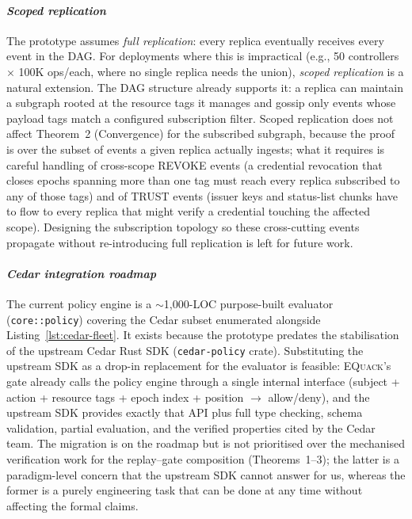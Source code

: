 \documentclass[10pt,journal,compsoc]{IEEEtran}
\newcommand{\equack}{\textsc{EQuack}}
\begin{document}
\paragraph*{\textit{Scoped replication}}
The prototype assumes \emph{full replication}: every replica eventually receives every event in the DAG. For deployments where this is impractical (e.g., 50 controllers $\times$ 100K ops/each, where no single replica needs the union), \emph{scoped replication} is a natural extension. The DAG structure already supports it: a replica can maintain a subgraph rooted at the resource tags it manages and gossip only events whose payload tags match a configured subscription filter. Scoped replication does not affect Theorem~2 (Convergence) for the subscribed subgraph, because the proof is over the subset of events a given replica actually ingests; what it requires is careful handling of cross-scope \textsc{REVOKE} events (a credential revocation that closes epochs spanning more than one tag must reach every replica subscribed to any of those tags) and of TRUST events (issuer keys and status-list chunks have to flow to every replica that might verify a credential touching the affected scope). Designing the subscription topology so these cross-cutting events propagate without re-introducing full replication is left for future work.

\paragraph*{\textit{Cedar integration roadmap}}
The current policy engine is a $\sim$1{,}000-LOC purpose-built evaluator (\texttt{core::policy}) covering the Cedar subset enumerated alongside Listing~\ref{lst:cedar-fleet}. It exists because the prototype predates the stabilisation of the upstream Cedar Rust SDK (\texttt{cedar-policy} crate). Substituting the upstream SDK as a drop-in replacement for the evaluator is feasible: \equack{}'s gate already calls the policy engine through a single internal interface (subject + action + resource tags + epoch index + position $\rightarrow$ allow/deny), and the upstream SDK provides exactly that API plus full type checking, schema validation, partial evaluation, and the verified properties cited by the Cedar team. The migration is on the roadmap but is not prioritised over the mechanised verification work for the replay--gate composition (Theorems~1--3); the latter is a paradigm-level concern that the upstream SDK cannot answer for us, whereas the former is a purely engineering task that can be done at any time without affecting the formal claims.
\end{document}
